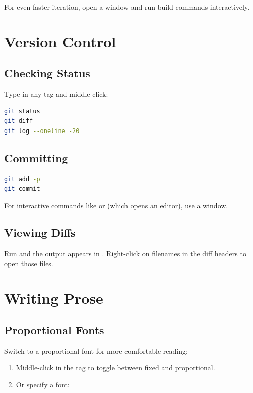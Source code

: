 For even faster iteration, open a  window and run build
commands interactively.

\section{Version Control}
\label{sec:vcs}


\subsection{Checking Status}

Type in any tag and middle-click:

\begin{lstlisting}[language=bash]
git status
git diff
git log --oneline -20
\end{lstlisting}

\subsection{Committing}

\begin{lstlisting}[language=bash]
git add -p
git commit
\end{lstlisting}

For interactive commands like  or 
(which opens an editor), use a  window.

\subsection{Viewing Diffs}

Run  and the output appears in .
Right-click on filenames in the diff headers to open those files.

\section{Writing Prose}
\label{sec:prose}

\subsection{Proportional Fonts}

Switch to a proportional font for more comfortable reading:

\begin{enumerate}
\item Middle-click  in the tag to toggle between fixed and
      proportional.
\item Or specify a font: 
\end{enumerate}


